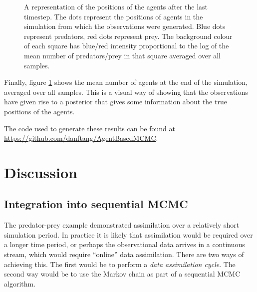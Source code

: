 \documentclass{article}
\begin{document}
\begin{figure}
	\centering
	\caption{A representation of the positions of the agents after the last timestep. The dots represent the positions of agents in the simulation from which the observations were generated. Blue dots represent predators, red dots represent prey. The background colour of each square has blue/red intensity proportional to the log of the mean number of predators/prey in that square averaged over all samples.}
	\label{figEndState}
\end{figure}

Finally, figure \ref{figEndState} shows the mean number of agents at the end of the simulation, averaged over all samples. This is a visual way of showing that the observations have given rise to a posterior that gives some information about the true positions of the agents.

The code used to generate these results can be found at \url{https://github.com/danftang/AgentBasedMCMC}.

\section{Discussion} 
\label{discussion}

 
\subsection{Integration into sequential MCMC}

The predator-prey example demonstrated assimilation over a relatively short simulation period. In practice it is likely that assimilation would be required over a longer time period, or perhaps the observational data arrives in a continuous stream, which would require ``online'' data assimilation. There are two ways of achieving this. The first would be to perform a \textit{data assimilation cycle}. The second way would be to use the Markov chain as part of a sequential MCMC algorithm.
\end{document}
